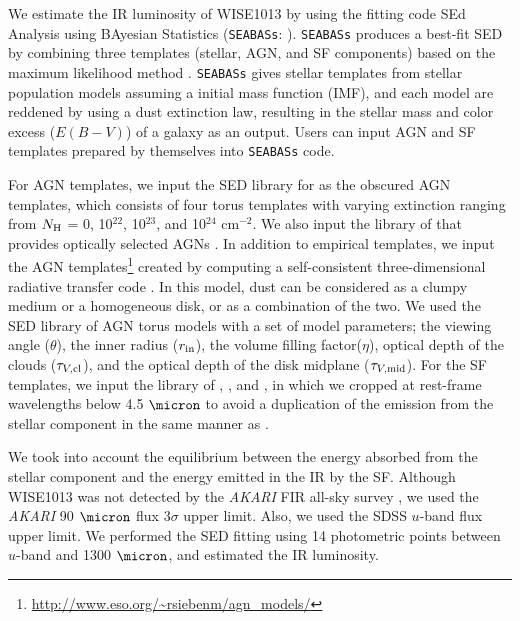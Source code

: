 \documentclass[twocolumn]{aastex6}
\begin{document}
We estimate the IR luminosity of WISE1013 by using the fitting code SEd Analysis using BAyesian Statistics ({\tt SEABASs}: \citealt{Rovilos}).
{\tt SEABASs} produces a best-fit SED by combining three templates (stellar, AGN, and SF components) based on the maximum likelihood method \citep[see ][for more detail]{Rovilos,Toba_17b}.
{\tt SEABASs} gives stellar templates from \cite{Bruzual} stellar population models assuming a \cite{Chabrier} initial mass function (IMF), and each model are reddened by using a \cite{Calzetti} dust extinction law, resulting in the stellar mass and color excess ($E (B-V)$) of a galaxy as an output.
Users can input AGN and SF templates prepared by themselves into {\tt SEABASs} code.

For AGN templates, we input the SED library for \cite{Silva} as the obscured AGN templates, which consists of four torus templates with varying extinction ranging from $N_{\rm H}$ = 0, 10$^{22}$, 10$^{23}$, and  10$^{24}$ cm$^{-2}$.
We also input the library of \cite{Polletta} that provides optically selected AGNs \citep[see ][for more detail]{Polletta}.
In addition to empirical templates, we input the AGN templates\footnote{\url{http://www.eso.org/~rsiebenm/agn_models/}} created by computing a self-consistent three-dimensional radiative transfer code \citep{Siebenmorgen}.
In this model, dust can be considered as a clumpy medium or a homogeneous disk, or as a combination of the two.
We used the SED library of AGN torus models with a set of model parameters; the viewing angle ($\theta$), the inner radius ($r_{\rm in}$), the volume filling factor($\eta$), optical depth of the clouds ($\tau_{V,{\rm cl}}$), and the optical depth of the disk midplane ($\tau_{V,{\rm mid}}$).
For the SF templates, we input the library of \cite{Chary}, \cite{Polletta}, and \cite{Mullaney}, in which we cropped at rest-frame wavelengths below 4.5 $\micron$ to avoid a duplication of the emission from the stellar component in the same manner as \cite{Rovilos}.

We took into account the equilibrium between the energy absorbed from the stellar component and the energy emitted in the IR by the SF.
Although WISE1013 was not detected by the {\it AKARI} FIR all-sky survey \citep{Yamamura}, we used the {\it AKARI} 90 $\micron$ flux 3$\sigma$ upper limit.
Also, we used the SDSS $u$-band flux upper limit.
We performed the SED fitting using 14 photometric points between $u$-band and 1300 $\micron$, and estimated the IR luminosity.
\end{document}
